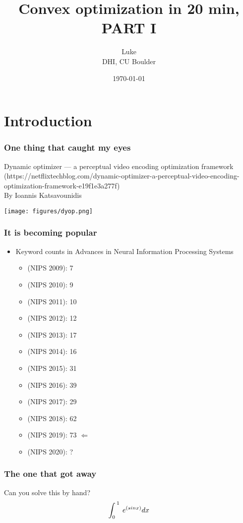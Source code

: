 \documentclass[10pt,mathserif]{beamer}
\title{\large \bfseries Convex optimization in 20 min, PART I}
\author{Luke\\[3ex]
DHI, CU Boulder}
\date{\today}
\begin{document}
\frame{
\thispagestyle{empty}
\titlepage
}

\section{Introduction}
\begin{frame}
\frametitle{One thing that caught my eyes}

Dynamic optimizer — a perceptual video encoding optimization framework (https://netflixtechblog.com/dynamic-optimizer-a-perceptual-video-encoding-optimization-framework-e19f1e3a277f)\\
By Ioannis Katsavounidis\\

\begin{center}
\texttt{[image: figures/dyop.png]}
\end{center}
\end{frame}

\begin{frame}
\frametitle{It is becoming popular}
\begin{itemize}\itemsep=12pt
\item Keyword counts in Advances in Neural Information Processing Systems 
\vspace*{0.5em}
\begin{itemize}
\item  (NIPS 2009): 7
\item  (NIPS 2010): 9
\item  (NIPS 2011): 10
\item  (NIPS 2012): 12
\item  (NIPS 2013): 17
\item  (NIPS 2014): 16
\item  (NIPS 2015): 31
\item  (NIPS 2016): 39
\item  (NIPS 2017): 29
\item  (NIPS 2018): 62
\item  (NIPS 2019): 73  $\Leftarrow$
\item  (NIPS 2020): ? 
\end{itemize}
\end{itemize}

\end{frame}

\begin{frame}\frametitle{The one that got away}
\begin{block}{Can you solve this by hand?}
	\[\Huge \int _{0\:}^{\:1}\:e^{\left(sinx\right)}dx\]
\end{block}

	
\end{frame}
\end{document}
